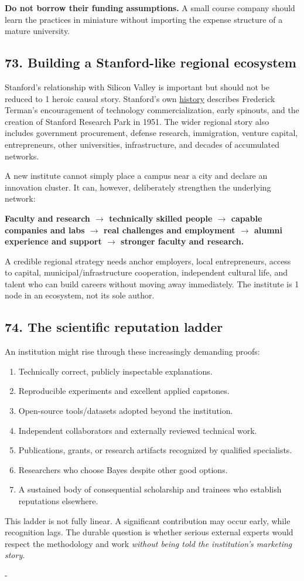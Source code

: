 \textbf{Do not borrow their funding assumptions.} A small course company should learn the practices in miniature without importing the expense structure of a mature university.

\subsection{73. Building a Stanford-like regional ecosystem}

Stanford's relationship with Silicon Valley is important but should not be reduced to 1 heroic causal story. Stanford's own \href{https://www.stanford.edu/\allowbreak about/history}{history} describes Frederick Terman's encouragement of technology commercialization, early spinouts, and the creation of Stanford Research Park in 1951. The wider regional story also includes government procurement, defense research, immigration, venture capital, entrepreneurs, other universities, infrastructure, and decades of accumulated networks.

A new institute cannot simply place a campus near a city and declare an innovation cluster. It can, however, deliberately strengthen the underlying network:

\textbf{Faculty and research $\rightarrow$ technically skilled people $\rightarrow$ capable companies and labs $\rightarrow$ real challenges and employment $\rightarrow$ alumni experience and support $\rightarrow$ stronger faculty and research.}

A credible regional strategy needs anchor employers, local entrepreneurs, access to capital, municipal/\allowbreak infrastructure cooperation, independent cultural life, and talent who can build careers without moving away immediately. The institute is 1 node in an ecosystem, not its sole author.

\subsection{74. The scientific reputation ladder}

An institution might rise through these increasingly demanding proofs:

\begin{enumerate}[leftmargin=*,itemsep=1.5pt]
  \item Technically correct, publicly inspectable explanations.
  \item Reproducible experiments and excellent applied capstones.
  \item Open-source tools/\allowbreak datasets adopted beyond the institution.
  \item Independent collaborators and externally reviewed technical work.
  \item Publications, grants, or research artifacts recognized by qualified specialists.
  \item Researchers who choose Bayes despite other good options.
  \item A sustained body of consequential scholarship and trainees who establish reputations elsewhere.
\end{enumerate}

This ladder is not fully linear. A significant contribution may occur early, while recognition lags. The durable question is whether serious external experts would respect the methodology and work \textit{without being told the institution's marketing story}.

-


